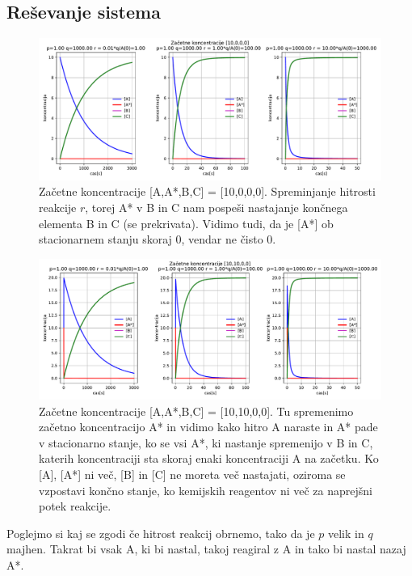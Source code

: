\documentclass[11pt, a4paper]{article}
\begin{document}
\subsection{Reševanje sistema}
\begin{figure}[H]
\hspace*{-1cm}     
  \includegraphics[width=20cm]{prva_osnovni_zacet_pogoji.pdf}
  \caption{Začetne koncentracije [A,A*,B,C] = [10,0,0,0]. Spreminjanje hitrosti reakcije $r$, torej A* v B in C nam pospeši nastajanje končnega elementa B in C (se prekrivata). Vidimo tudi, da je [A*] ob stacionarnem stanju skoraj 0, vendar ne čisto 0.}
\end{figure}

\begin{figure}[H]
\hspace*{-1cm}     
  \includegraphics[width=19cm]{prva_drugi_zacet_pogoji.pdf}
  \caption{Začetne koncentracije [A,A*,B,C] = [10,10,0,0]. Tu spremenimo začetno koncentracijo A* in vidimo kako hitro A naraste in A* pade v stacionarno stanje, ko se vsi A*, ki nastanje spremenijo v B in C, katerih koncentraciji sta skoraj enaki koncentraciji A na začetku. Ko [A], [A*] ni več, [B] in [C] ne moreta več nastajati, oziroma se vzpostavi končno stanje, ko kemijskih reagentov ni več za naprejšni potek reakcije.} 
\end{figure}
Poglejmo si kaj se zgodi če hitrost reakcij obrnemo, tako da je $p$ velik in $q$ majhen. Takrat bi vsak A, ki bi nastal, takoj reagiral z A in tako bi nastal nazaj A*.\newline
\end{document}
